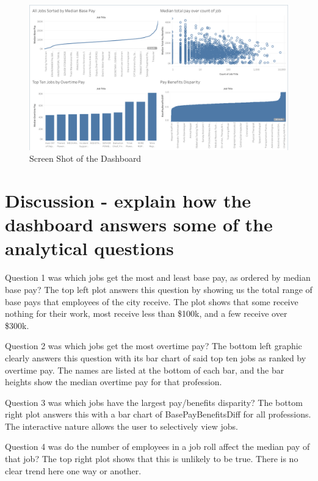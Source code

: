 \documentclass{article}
\begin{document}
\begin{figure}[h!]
\centering
\includegraphics[scale=0.35]{dashboard_screenshot.png}
\caption{Screen Shot of the Dashboard}
\label{fig:dashboard}
\end{figure}

\section{Discussion - explain how the dashboard answers some of the analytical questions}

Question 1 was which jobs get the most and least base pay, as ordered by median base pay? The top left plot answers this question by showing us the total range of base pays that employees of the city receive. The plot shows that some receive nothing for their work, most receive less than \$100k, and a few receive over \$300k. 

Question 2 was which jobs get the most overtime pay? The bottom left graphic clearly answers this question with its bar chart of said top ten jobs as ranked by overtime pay. The names are listed at the bottom of each bar, and the bar heights show the median overtime pay for that profession. 

Question 3 was which jobs have the largest pay/benefits disparity? The bottom right plot answers this with a bar chart of BasePayBenefitsDiff for all professions. The interactive nature allows the user to selectively view jobs. 

Question 4 was do the number of employees in a job roll affect the median pay of that job? The top right plot shows that this is unlikely to be true. There is no clear trend here one way or another. 
\end{document}
